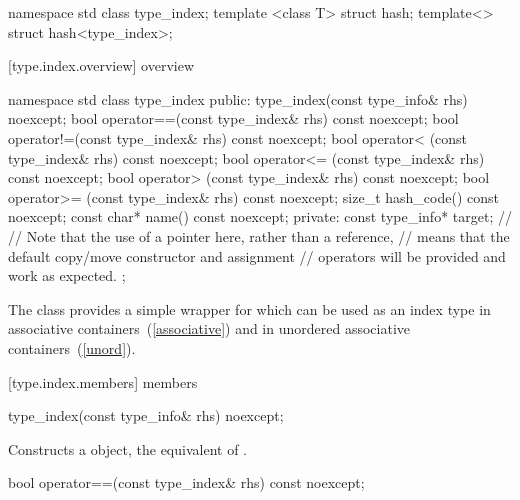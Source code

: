 \begin{codeblock}
namespace std {
  class type_index;
  template <class T> struct hash;
  template<> struct hash<type_index>;
}
\end{codeblock}

[type.index.overview]{ overview}

%
\begin{codeblock}
namespace std {
  class type_index {
  public:
    type_index(const type_info& rhs) noexcept;
    bool operator==(const type_index& rhs) const noexcept;
    bool operator!=(const type_index& rhs) const noexcept;
    bool operator< (const type_index& rhs) const noexcept;
    bool operator<= (const type_index& rhs) const noexcept;
    bool operator> (const type_index& rhs) const noexcept;
    bool operator>= (const type_index& rhs) const noexcept;
    size_t hash_code() const noexcept;
    const char* name() const noexcept;
  private:
    const type_info* target;    // \expos
    // Note that the use of a pointer here, rather than a reference,
    // means that the default copy/move constructor and assignment
    // operators will be provided and work as expected.
  };
}
\end{codeblock}

\pnum
The class  provides a simple wrapper for
 which can be used as an index type in associative
containers~(\ref{associative}) and in unordered associative
containers~(\ref{unord}).

[type.index.members]{ members}

%
\begin{itemdecl}
type_index(const type_info& rhs) noexcept;
\end{itemdecl}

\begin{itemdescr}
\pnum
\effects Constructs a  object, the equivalent of .
\end{itemdescr}

%
\begin{itemdecl}
bool operator==(const type_index& rhs) const noexcept;
\end{itemdecl}

\begin{itemdescr}
\pnum
\returns {}
\end{itemdescr}

